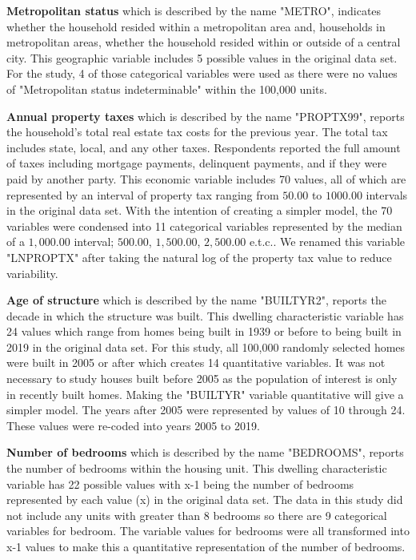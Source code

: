 \indent \textbf{Metropolitan status} which is described by the name "METRO", indicates whether the household resided within a metropolitan area and, households in metropolitan areas, whether the household resided within or outside of a central city. This geographic variable includes 5 possible values in the original data set.\cite{IPUMS} For the study, 4 of those categorical variables were used as there were no values of "Metropolitan status indeterminable" within the 100,000 units.


\indent \textbf{Annual property taxes} which is described by the name "PROPTX99", reports the household's total real estate tax costs for the previous year. The total tax includes state, local, and any other taxes. Respondents reported the full amount of taxes including mortgage payments, delinquent payments, and if they were paid by another party. This economic variable includes 70 values, all of which are represented by an interval of property tax ranging from $50.00$ to $1000.00$ intervals in the original data set.\cite{IPUMS} With the intention of creating a simpler model, the 70 variables were condensed into 11 categorical variables represented by the median of a $1,000.00$ interval; $500.00$, $1,500.00$, $2,500.00$ e.t.c.. We renamed this variable "LNPROPTX" after taking the natural log of the property tax value to reduce variability.


\indent \textbf{Age of structure} which is described by the name "BUILTYR2", reports the decade in which the structure was built. This dwelling characteristic variable has 24 values which range from homes being built in 1939 or before to being built in 2019 in the original data set. For this study, all 100,000 randomly selected homes were built in 2005 or after which creates 14 quantitative variables.\cite{IPUMS} It was not necessary to study houses built before 2005 as the population of interest is only in recently built homes. Making the "BUILTYR" variable quantitative will give a simpler model. The years after 2005 were represented by values of 10 through 24. These values were re-coded into years 2005 to 2019.


\indent \textbf{Number of bedrooms} which is described by the name "BEDROOMS", reports the number of bedrooms within the housing unit. This dwelling characteristic variable has 22 possible values with x-1 being the number of bedrooms represented by each value (x) in the original data set. The data in this study did not include any units with greater than 8 bedrooms so there are 9 categorical variables for bedroom.\cite{IPUMS} The variable values for bedrooms were all transformed into x-1 values to make this a quantitative representation of the number of bedrooms.


